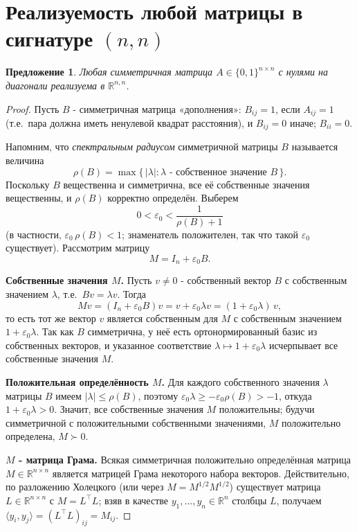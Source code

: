 \documentclass[12pt]{article}
\newtheorem{proposition}{Предложение}
\newcommand{\R}{\mathbb{R}}
\begin{document}
\section{Реализуемость любой матрицы в сигнатуре \texorpdfstring{$(n,n)$}{(n,n)}}

\begin{proposition}\label{prop:realize}
Любая симметричная матрица \(A \in \{0,1\}^{n\times n}\) с нулями на диагонали реализуема в \(\R^{n,n}\).
\end{proposition}

\begin{proof}
Пусть \(B\) - симметричная матрица «дополнения»: \(B_{ij}=1\), если \(A_{ij}=1\) (т.е.\ пара должна иметь ненулевой квадрат расстояния), и \(B_{ij}=0\) иначе; \(B_{ii}=0\).

Напомним, что \emph{спектральным радиусом} симметричной матрицы \(B\) называется величина
\[
\rho(B) = \max\{\,|\lambda| : \lambda \text{ - собственное значение } B\,\}.
\]
Поскольку \(B\) вещественна и симметрична, все её собственные значения вещественны, и \(\rho(B)\) корректно определён. Выберем
\[
0<\varepsilon_0<\frac{1}{\rho(B)+1}
\]
(в частности, \(\varepsilon_0\,\rho(B)<1\); знаменатель положителен, так что такой \(\varepsilon_0\) существует). Рассмотрим матрицу
\[
M = I_n + \varepsilon_0 B .
\]

\textbf{Собственные значения \(M\).} Пусть \(v\ne 0\) - собственный вектор \(B\) с собственным значением \(\lambda\), т.е.\ \(Bv=\lambda v\). Тогда
\[
M v = (I_n+\varepsilon_0 B)v = v + \varepsilon_0\lambda v = (1+\varepsilon_0\lambda)\,v,
\]
то есть тот же вектор \(v\) является собственным для \(M\) с собственным значением \(1+\varepsilon_0\lambda\). Так как \(B\) симметрична, у неё есть ортонормированный базис из собственных векторов, и указанное соответствие \(\lambda\mapsto 1+\varepsilon_0\lambda\) исчерпывает все собственные значения \(M\).

\textbf{Положительная определённость \(M\).} Для каждого собственного значения \(\lambda\) матрицы \(B\) имеем \(|\lambda|\le\rho(B)\), поэтому \(\varepsilon_0\lambda\ge-\varepsilon_0\rho(B)>-1\), откуда \(1+\varepsilon_0\lambda>0\). Значит, все собственные значения \(M\) положительны; будучи симметричной с положительными собственными значениями, \(M\) положительно определена, \(M\succ0\).

\textbf{\(M\) - матрица Грама.} Всякая симметричная положительно определённая матрица \(M\in\R^{n\times n}\) является матрицей Грама некоторого набора векторов. Действительно, по разложению Холецкого (или через \(M=M^{1/2}M^{1/2}\)) существует матрица \(L\in\R^{n\times n}\) с \(M=L^{\top}L\); взяв в качестве \(y_1,\dots,y_n\in\R^n\) столбцы \(L\), получаем \(\langle y_i,y_j\rangle = (L^{\top}L)_{ij} = M_{ij}\).


\end{proof}
\end{document}
